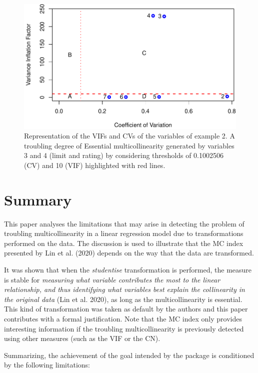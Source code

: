 \begin{figure}
\centering
\includegraphics{salmeron-etal_files/figure-latex/FigureExample2-1.pdf}
\caption{\label{fig:FigureExample2}Representation of the VIFs and CVs of the variables of example 2. A troubling degree of Essential multicollinearity generated by variables 3 and 4 (limit and rating) by considering thresholds of 0.1002506 (CV) and 10 (VIF) highlighted with red lines.}
\end{figure}

\hypertarget{summary}{%
\section{Summary}\label{summary}}

This paper analyses the limitations that may arise in detecting the problem of troubling multicollinearity in a linear regression model due to transformations performed on the data. The discussion is used to illustrate that the MC index presented by Lin et al. (2020) depends on the way that the data are transformed.

It was shown that when the \emph{studentise} transformation is performed, the measure is stable for \emph{measuring what variable contributes the most to the linear relationship, and thus identifying what variables best explain the collinearity in the original data} (Lin et al. 2020), as long as the multicollinearity is essential. This kind of transformation was taken as default by the authors and this paper contributes with a formal justification. Note that the MC index only provides interesting information if the troubling multicollinearity is previously detected using other measures (such as the VIF or the CN).

Summarizing, the achievement of the goal intended by the  package is conditioned by the following limitations:

